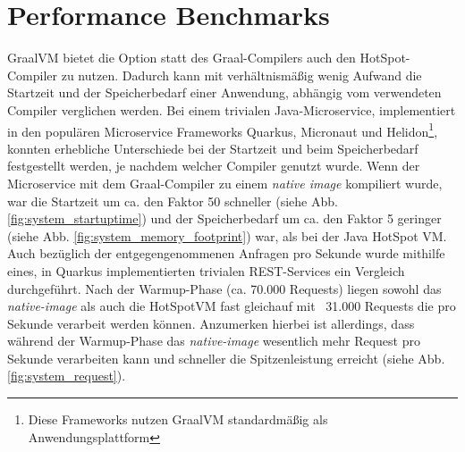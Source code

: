 \section{Performance Benchmarks}
\label{sec:performanceBenchmarks}

GraalVM bietet die Option statt des Graal-Compilers auch den HotSpot-Compiler zu nutzen. Dadurch kann mit verhältnismäßig wenig Aufwand
die Startzeit und der Speicherbedarf einer Anwendung, abhängig vom verwendeten Compiler verglichen werden. Bei einem trivialen Java-Microservice, implementiert in den populären
Microservice Frameworks Quarkus, Micronaut und Helidon\footnote{Diese Frameworks nutzen GraalVM standardmäßig als Anwendungsplattform}, konnten erhebliche Unterschiede bei der Startzeit und 
beim Speicherbedarf festgestellt werden, je nachdem welcher Compiler genutzt wurde. Wenn der Microservice mit dem Graal-Compiler zu einem \textit{native image} kompiliert wurde, war die Startzeit um
ca. den Faktor 50 schneller (siehe Abb. \ref{fig:system_startuptime}) und der Speicherbedarf um ca. den Faktor 5 geringer (siehe Abb. \ref{fig:system_memory_footprint}) war,
 als bei der Java HotSpot VM. Auch bezüglich der entgegengenommenen Anfragen pro Sekunde wurde mithilfe eines, in Quarkus implementierten
 trivialen REST-Services ein Vergleich durchgeführt. Nach der Warmup-Phase (ca. 70.000 Requests) liegen sowohl das \textit{native-image} als auch die HotSpotVM fast gleichauf mit ~31.000 Requests die pro
 Sekunde verarbeit werden können. Anzumerken hierbei ist allerdings, dass während der Warmup-Phase das \textit{native-image} wesentlich mehr Request pro Sekunde verarbeiten kann und schneller die
 Spitzenleistung erreicht (siehe Abb. \ref{fig:system_request}).
 
